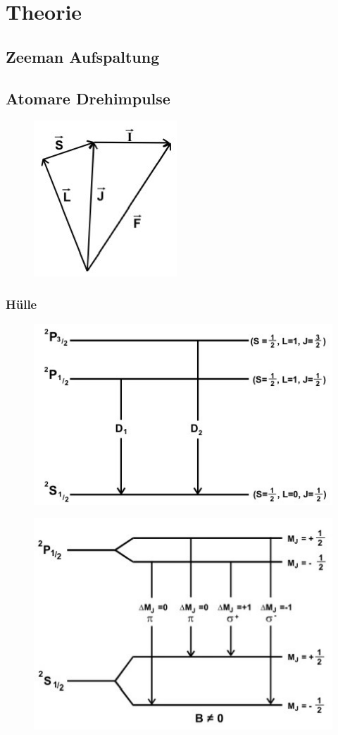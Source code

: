 \section[Theorie]{Theorie \textnormal{\cite{pumpen}}}
\label{sec:theorie}

\subsection{Zeeman Aufspaltung}

\subsection{Atomare Drehimpulse}

\begin{figure}[H]
	\centering
	\includegraphics[width=0.25\linewidth]{content/grafik/drehimpulse.jpg}
	\caption{\cite{pumpen}}
	\label{fig:drehimpulse}
\end{figure}

\subsubsection{Hülle}

\begin{figure}[H]
	\centering
	\includegraphics[width=0.5\linewidth]{content/grafik/duplett.jpg}
	\caption{\cite{pumpen}}
	\label{fig:duplett}
\end{figure}

\begin{figure}[H]
	\centering
	\includegraphics[width=0.55\linewidth]{content/grafik/zeeman.jpg}
	\caption{\cite{pumpen}}
	\label{fig:zeeman}
\end{figure}

